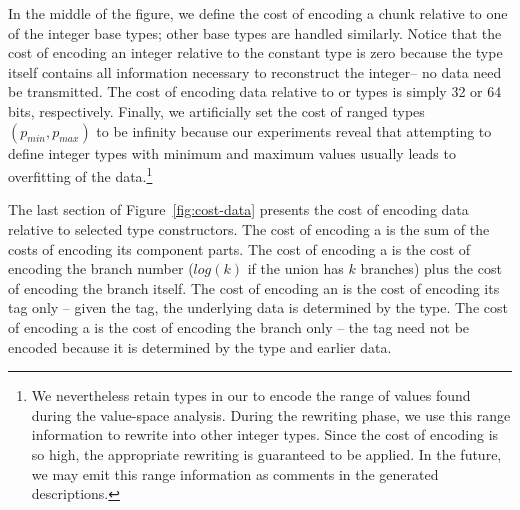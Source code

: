 In the middle of the figure,
we define the cost of encoding a chunk relative to one of the integer base 
types; other base types are handled similarly.  Notice that the cost of 
encoding an integer relative to the constant type  is
zero because the type itself contains all information
necessary to reconstruct the integer-- no data need be transmitted.
The cost of encoding data relative to  or  types 
is simply 32 or 64 bits, respectively.  Finally, we artificially set the cost of
ranged types $(p_{min},p_{max})$ to be infinity because
our experiments reveal that attempting to define integer types with
minimum and maximum values usually leads to overfitting of the data.\footnote{
We nevertheless retain  types in our \ir{} to encode
the range of values found during the value-space analysis.  During the
rewriting phase, we use this range information to rewrite 
into other integer types.  Since the
cost of encoding  is so high, the appropriate rewriting 
is guaranteed to be applied.  In the future, we may emit this range information
as comments in the generated descriptions.}

The last section of Figure~\ref{fig:cost-data} presents the cost of
encoding data relative to selected type constructors.  
The cost of encoding a  is the sum of the costs of encoding
its component parts.  The cost of encoding a  is the cost
of encoding the branch number ($log(k)$ if the union has $k$ branches)
plus the cost of encoding the branch itself.  The cost of encoding
an  is the cost of encoding its tag only -- given the tag,
the underlying data is determined by the type.  The cost of encoding
a  is the cost of encoding the branch only -- the tag need not
be encoded because it is determined by the type and earlier data.

